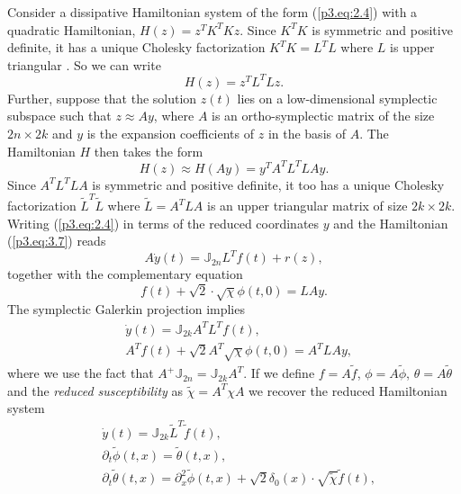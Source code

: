 Consider a dissipative Hamiltonian system of the form (\ref{p3.eq:2.4}) with a quadratic Hamiltonian, $H(z) = z^TK^TKz$. Since $K^TK$ is symmetric and positive definite, it has a unique Cholesky factorization $K^TK = L^T L$ where $L$ is upper triangular \cite{strang09}. So we can write 
\begin{equation} \label{p3.eq:3.7}
H(z) = z^T L^T L z.
\end{equation}
Further, suppose that the solution $z(t)$ lies on a low-dimensional symplectic subspace such that $z \approx Ay$, where $A$ is an ortho-symplectic matrix of the size $2n\times 2k$ and $y$ is the expansion coefficients of $z$ in the basis of $A$. The Hamiltonian $H$ then takes the form
\begin{equation} \label{p3.eq:3.8}
	H(z) \approx H(Ay) = y^T A^T L^T L A y.
\end{equation}
Since $A^T L^T L A$ is symmetric and positive definite, it too has a unique Cholesky factorization $\tilde L^T \tilde L$ where $\tilde L = A^T L A$ is an upper triangular matrix of size $2k \times 2k$. Writing (\ref{p3.eq:2.4}) in terms of the reduced coordinates $y$ and the Hamiltonian (\ref{p3.eq:3.7}) reads
\begin{equation} \label{p3.eq:3.9}
		A\dot{y}(t) = \mathbb J_{2n} L^T f(t) + r(z),
\end{equation}
together with the complementary equation
\begin{equation} \label{p3.eq:3.10}
	f(t) + \sqrt 2 \cdot \sqrt{\chi} \phi(t,0) = LAy.
\end{equation}
The symplectic Galerkin projection implies
\begin{align} \label{p3.eq:3.11}
	& \dot y(t) = \mathbb J_{2k} A^T L^T f(t), \\
	& A^T f(t) + \sqrt{2} A^T \sqrt{\chi} \phi(t,0) = A^T L A y,
\end{align}
where we use the fact that $A^+\mathbb J_{2n} = \mathbb{J}_{2k} A^T$. If we define $f = A \tilde f$, $\phi = A \tilde \phi$, $\theta = A\tilde \theta$ and the \emph{reduced susceptibility} as $\tilde \chi = A^T \chi A$ we recover the reduced Hamiltonian system
\begin{subequations}
\begin{align}
		\label{p3.eq:3.12.a} & \dot{y}(t) = \mathbb J_{2k} {\tilde L}^T \tilde f(t), \\
		\label{p3.eq:3.12.b} & \partial_t \tilde \phi(t,x) = \tilde \theta(t,x),\\
		\label{p3.eq:3.12.c} & \partial_t \tilde \theta(t,x) = \partial_x^2 \tilde \phi(t,x) + \sqrt 2 \delta_0(x) \cdot \sqrt{\tilde \chi}  \tilde f(t),
\end{align}
\end{subequations}
